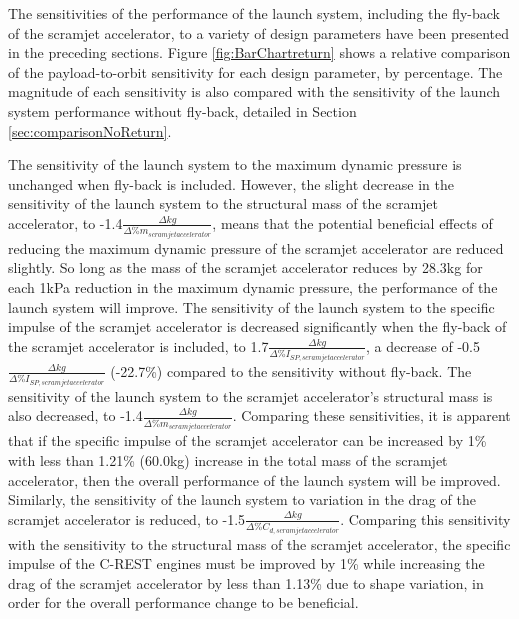 The sensitivities of the performance of the launch system, including the fly-back of the scramjet accelerator, to a variety of design parameters have been presented in the preceding sections. Figure \ref{fig:BarChartreturn} shows a relative comparison of the payload-to-orbit sensitivity for each design parameter, by percentage. The magnitude of each sensitivity is also compared with the sensitivity of the launch system performance without fly-back, detailed in Section \ref{sec:comparisonNoReturn}.

The sensitivity of the launch system to the maximum dynamic pressure is unchanged when fly-back is included. However, the slight decrease in the sensitivity of the launch system to the structural mass of the scramjet accelerator, to -1.4$\frac{\Delta kg}{\Delta\%m_{scramjet accelerator}}$, means that the potential beneficial effects of reducing the maximum dynamic pressure of the scramjet accelerator are reduced slightly. So long as the mass of the scramjet accelerator reduces by 28.3kg for each 1kPa reduction in the maximum dynamic pressure, the performance of the launch system will improve.
 The sensitivity of the launch system to the specific impulse of the scramjet accelerator is decreased significantly when the fly-back of the scramjet accelerator is included, to 1.7$\frac{\Delta kg}{\Delta\%I_{SP,scramjet accelerator}}$, a decrease of -0.5$\frac{\Delta kg}{\Delta\%I_{SP,scramjet accelerator}}$ (-22.7\%) compared to the sensitivity without fly-back. The sensitivity of the launch system to the scramjet accelerator's structural mass is also decreased, to -1.4$\frac{\Delta kg}{\Delta\%m_{scramjet accelerator}}$. Comparing these sensitivities, it is apparent that if the specific impulse of the scramjet accelerator can be increased by 1\% with less than 1.21\% (60.0kg) increase in the total mass of the scramjet accelerator, then the overall performance of the launch system will be improved.  
Similarly, the sensitivity of the launch system to variation in the drag of the scramjet accelerator is reduced, to -1.5$\frac{\Delta kg}{\Delta\%C_{d,scramjet accelerator}}$. Comparing this sensitivity with the sensitivity to the structural mass of the scramjet accelerator, the specific impulse of the C-REST engines must be improved by 1\% while increasing the drag of the scramjet accelerator by less than 1.13\% due to shape variation, in order for the overall performance change to be beneficial. 

